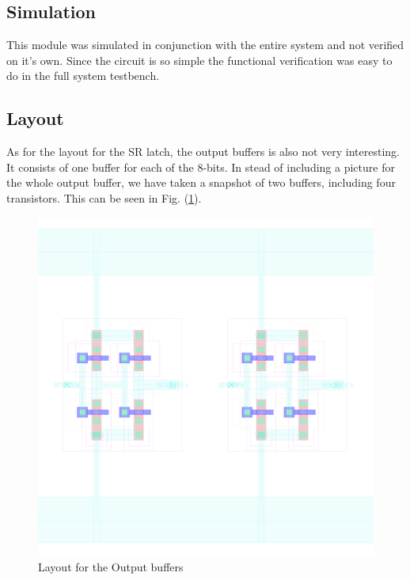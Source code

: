 \documentclass[english, 12pt, a4paper]{ifimaster}
\begin{document}
\subsection{Simulation}
This module was simulated in conjunction with the entire system and not verified on it's own. 
Since the circuit is so simple the functional verification was easy to do in the full system testbench.

\subsection{Layout}
As for the layout for the SR latch, the output buffers is also not very interesting. It consists of one buffer for each of the 8-bits. In stead of including 
a picture for the whole output buffer, we have taken a snapshot of two buffers, including four transistors. This can be seen in Fig. (\ref{fig:layout:buff:out}). 

 \begin{figure}[!ht]
  \centering
  \includegraphics[width=\textwidth]{img/layout/bufferout_one}
  \caption{Layout for the Output buffers}
  \label{fig:layout:buff:out}
 \end{figure}

\end{document}
